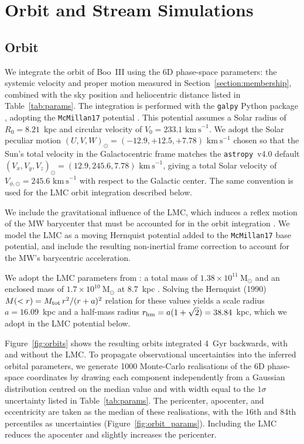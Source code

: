 \documentclass[twocolumn]{aastex631}
\newcommand{\vlosUnits}{$\mathrm{km~s}^{-1}$\xspace}
\begin{document}
\section{Orbit and Stream Simulations} 

\subsection{Orbit} \label{section:orbit}
We integrate the orbit of Boo~III using the 6D phase-space parameters: the systemic velocity and proper motion measured in Section~\ref{section:membership}, combined with the sky position and heliocentric distance listed in Table~\ref{tab:params}. The integration is performed with the \texttt{galpy} Python package \citep{Bovy2015}, adopting the \texttt{McMillan17} potential \citep{McMillan2017}. This potential assumes a Solar radius of $R_0 = 8.21$~kpc and circular velocity of $V_0 = 233.1$ \vlosUnits. We adopt the Solar peculiar motion $(U,V,W)_\odot = (-12.9, +12.5, +7.78)$ \vlosUnits chosen so that the Sun's total velocity in the Galactocentric frame matches the \texttt{astropy}~v4.0 default $(V_x, V_y, V_z)_\odot = (12.9, 245.6, 7.78)$ \vlosUnits \citep{Drimmel2018}, giving a total Solar velocity of $V_{\phi,\odot} = 245.6$ \vlosUnits with respect to the Galactic center. The same convention is used for the LMC orbit integration described below.

We include the gravitational influence of the LMC, which induces a reflex motion of the MW barycenter that must be accounted for in the orbit integration \citep{Erkal2019, Petersen2021}. We model the LMC as a moving Hernquist potential \citep{Hernquist1990} added to the \texttt{McMillan17} base potential, and include the resulting non-inertial frame correction to account for the MW's barycentric acceleration.

We adopt the LMC parameters from \citet{Pace2022}: a total mass of $1.38 \times 10^{11}~\mathrm{M}_\odot$ and an enclosed mass of $1.7 \times 10^{10}~\mathrm{M}_\odot$ at 8.7~kpc \citep{vanderMarel2014}.  Solving the Hernquist (1990) $M(<r) = M_{\rm tot}\,r^2/(r+a)^2$ relation for these values yields a scale radius $a = 16.09$~kpc and a half-mass radius $r_{\rm hm} = a(1+\sqrt{2}) = 38.84$~kpc, which we adopt in the LMC potential below.

Figure~\ref{fig:orbits} shows the resulting orbits integrated 4~Gyr backwards, with and without the LMC. To propagate observational uncertainties into the inferred orbital parameters, we generate 1000 Monte-Carlo realisations of the 6D phase-space coordinates by drawing each component independently from a Gaussian distribution centred on the median value and with width equal to the $1\sigma$ uncertainty listed in Table~\ref{tab:params}. The pericenter, apocenter, and eccentricity are taken as the median of these realisations, with the 16th and 84th percentiles as uncertainties (Figure~\ref{fig:orbit_params}). Including the LMC reduces the apocenter and slightly increases the pericenter.
\end{document}

